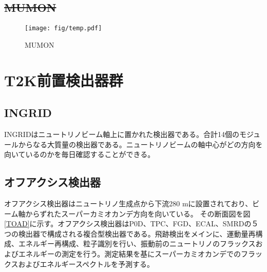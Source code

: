 \documentclass[11pt]{jreport}
\newcommand{\figref}[1]{図\ref{#1}}
\begin{document}
%



\subsection{\sout{MUMON}}

\begin{figure}[htb]
\begin{center}
\texttt{[image: fig/temp.pdf]}
\caption[MUMON]{MUMON}
\label{MUMON}
\end{center}
\end{figure}

\fi %

\section{T2K前置検出器群}
\subsection{INGRID}
INGRIDはニュートリノビーム軸上に置かれた検出器である。合計14個のモジュールからなる大質量の検出器である。ニュートリノビームの軸中心がどの方向を向いているのかを毎日確認することができる。


\subsection{オフアクシス検出器}
オフアクシス検出器はニュートリノ生成点から下流280 mに設置されており、ビーム軸からずれたスーパーカミオカンデ方向を向いている。
その断面図を\figref{TOAD}に示す。オフアクシス検出器はP0D、TPC、FGD、ECAL、SMRDの５つの検出器で構成される複合型検出器である。飛跡検出をメインに、運動量再構成、エネルギー再構成、粒子識別を行い、振動前のニュートリノのフラックスおよびエネルギーの測定を行う。測定結果を基にスーパーカミオカンデでのフラックスおよびエネルギースペクトルを予測する。
\end{document}
